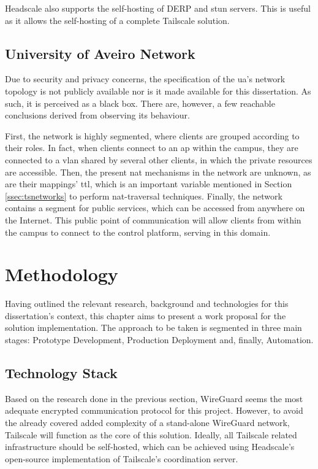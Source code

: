 \documentclass[11pt,twoside,a4paper]{report}
\begin{document}
Headscale also supports the self-hosting of \ac{DERP} and \ac{stun} servers. This is useful as it allows the self-hosting of a complete Tailscale solution.

\section{University of Aveiro Network}
\label{sec:uanet}

Due to security and privacy concerns, the specification of the \ac{ua}'s network topology is not publicly available nor is it made available for this dissertation. As such, it is perceived as a black box. There are, however, a few reachable conclusions derived from observing its behaviour.

First, the network is highly segmented, where clients are grouped according to their roles. In fact, when clients connect to an \ac{ap} within the campus, they are connected to a \ac{vlan} shared by several other clients, in which the private resources are accessible. Then, the present \ac{nat} mechanisms in the network are unknown, as are their mappings' \ac{ttl}, which is an important variable mentioned in Section \ref{ssec:tsnetworks} to perform \ac{nat}-traversal techniques. Finally, the network contains a segment for public services, which can be accessed from anywhere on the Internet. This public point of communication will allow clients from within the campus to connect to the control platform, serving in this domain.

\chapter{Methodology}
\label{chapter:method}

Having outlined the relevant research, background and technologies for this dissertation's context, this chapter aims to present a work proposal for the solution implementation. The approach to be taken is segmented in three main stages: Prototype Development, Production Deployment and, finally, Automation.

\section{Technology Stack}

Based on the research done in the previous section, WireGuard seems the most adequate encrypted communication protocol for this project. However, to avoid the already covered added complexity of a stand-alone WireGuard network, Tailscale will function as the core of this solution. Ideally, all Tailscale related infrastructure should be self-hosted, which can be achieved using Headscale's open-source implementation of Tailscale's coordination server.
\end{document}
